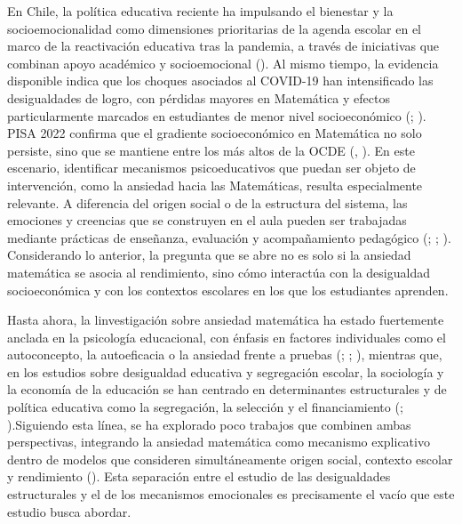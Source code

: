 \documentclass[
  spanish,
  a4paper,
  oneside]{scrbook}
\begin{document}
En Chile, la política educativa reciente ha impulsando el bienestar y la
socioemocionalidad como dimensiones prioritarias de la agenda escolar en
el marco de la reactivación educativa tras la pandemia, a través de
iniciativas que combinan apoyo académico y socioemocional
(). Al mismo tiempo, la
evidencia disponible indica que los choques asociados al COVID-19 han
intensificado las desigualdades de logro, con pérdidas mayores en
Matemática y efectos particularmente marcados en estudiantes de menor
nivel socioeconómico (;
). PISA 2022 confirma que el gradiente socioeconómico en Matemática
no solo persiste, sino que se mantiene entre los más altos de la OCDE
(,
). En este escenario, identificar
mecanismos psicoeducativos que puedan ser objeto de intervención, como
la ansiedad hacia las Matemáticas, resulta especialmente relevante. A
diferencia del origen social o de la estructura del sistema, las
emociones y creencias que se construyen en el aula pueden ser trabajadas
mediante prácticas de enseñanza, evaluación y acompañamiento pedagógico
(;
;
). Considerando lo anterior, la
pregunta que se abre no es solo si la ansiedad matemática se asocia al
rendimiento, sino cómo interactúa con la desigualdad socioeconómica y
con los contextos escolares en los que los estudiantes aprenden.

Hasta ahora, la linvestigación sobre ansiedad matemática ha estado
fuertemente anclada en la psicología educacional, con énfasis en
factores individuales como el autoconcepto, la autoeficacia o la
ansiedad frente a pruebas (;
;
), mientras que, en los
estudios sobre desigualdad educativa y segregación escolar, la
sociología y la economía de la educación se han centrado en
determinantes estructurales y de política educativa como la segregación,
la selección y el financiamiento
(; ).Siguiendo esta línea, se ha explorado poco trabajos que combinen
ambas perspectivas, integrando la ansiedad matemática como mecanismo
explicativo dentro de modelos que consideren simultáneamente origen
social, contexto escolar y rendimiento (). Esta separación entre el estudio de las desigualdades
estructurales y el de los mecanismos emocionales es precisamente el
vacío que este estudio busca abordar.
\end{document}
